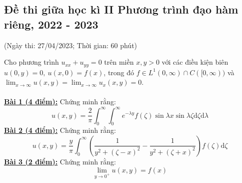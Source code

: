 \documentclass[10.5pt, a4paper]{article}
\begin{document}
\newpage

\subsection{Đề thi giữa học kì II Phương trình đạo hàm riêng, 2022 - 2023}
\begin{center}
	\color{blue}(Ngày thi: 27/04/2023; Thời gian: 60 phút)
\end{center}
Cho phương trình $u_{xx}+u_{yy}=0$ trên miền $x,y>0$ với các điều kiện biên $u(0,y)=0,~u(x,0)=f(x)$, trong đó $f\in L^1(0,\infty)\cap C([0,\infty))$ và $\displaystyle\lim_{x\rightarrow\infty}u(x,y)=\displaystyle\lim_{x\rightarrow\infty}u_x(x,y)=0$.\\\\
\color{red}\underline{\textbf{Bài 1 (4 điểm):}} \color{black} Chứng minh rằng: $$u(x,y)=\dfrac2\pi\displaystyle\int_0^\infty\displaystyle\int_0^\infty e^{-\lambda y}f(\zeta)\sin\lambda x\sin\lambda\zeta\text{d}\zeta\text{d}\lambda$$
\color{red}\underline{\textbf{Bài 2 (4 điểm):}} \color{black} Chứng minh rằng: $$u(x,y)=\dfrac y\pi\displaystyle\int_0^\infty\left(\dfrac{1}{y^2+(\zeta-x)^2}-\dfrac{1}{y^2+(\zeta+x)^2}\right)f(\zeta)\text{d}\zeta$$
\color{red}\underline{\textbf{Bài 3 (2 điểm):}} \color{black} Chứng minh rằng: $$\displaystyle\lim_{y\rightarrow0^+}u(x,y)=f(x)$$

\newpage
\end{document}
